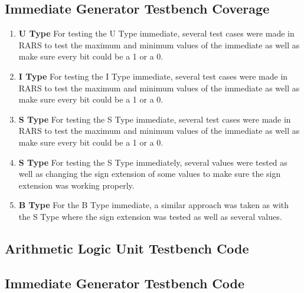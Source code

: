 \documentclass[
    a4paper, %
	12pt, %
    ]{CSSullivanBusinessReport}
\begin{document}
\begin{fullwidth}
\subsection{Immediate Generator Testbench Coverage} %


\begin{enumerate}
    \item \textbf{U Type} For testing the U Type immediate, several test cases were made in RARS to test the maximum and minimum values of the immediate as well as make sure every bit could be a 1 or a 0.
    \item \textbf{I Type} For testing the I Type immediate, several test cases were made in RARS to test the maximum and minimum values of the immediate as well as make sure every bit could be a 1 or a 0.
    \item \textbf{S Type} For testing the S Type immediate, several test cases were made in RARS to test the maximum and minimum values of the immediate as well as make sure every bit could be a 1 or a 0.
    \item \textbf{S Type} For testing the S Type immediately, several values were tested as well as changing the sign extension of some values to make sure the sign extension was working properly.
    \item \textbf{B Type} For the B Type immediate, a similar approach was taken as with the S Type where the sign extension was tested as well as several values.
\end{enumerate}

\captionsetup{style=widetable}
\subsection{Arithmetic Logic Unit Testbench Code} %



\newpage


\newpage
\subsection {Immediate Generator Testbench Code} %



\end{fullwidth}
\end{document}

